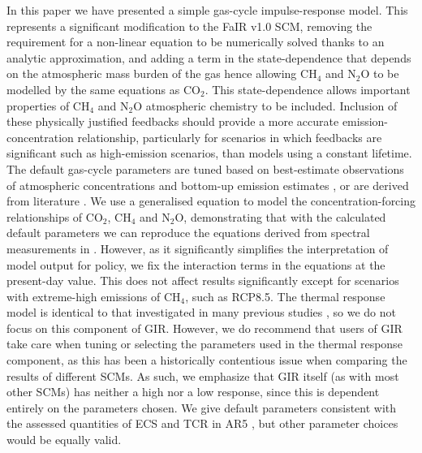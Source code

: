\documentclass[gmd, manuscript]{copernicus}
\begin{document}
\conclusions  %
In this paper we have presented a simple gas-cycle impulse-response model. This represents a significant modification to the FaIR v1.0 SCM, removing the requirement for a non-linear equation to be numerically solved thanks to an analytic approximation, and adding a term in the state-dependence that depends on the atmospheric mass burden of the gas hence allowing CH$_4$ and N$_2$O to be modelled by the same equations as CO$_2$. This state-dependence allows important properties of CH$_4$ and N$_2$O atmospheric chemistry to be included. Inclusion of these physically justified feedbacks should provide a more accurate emission-concentration relationship, particularly for scenarios in which feedbacks are significant such as high-emission scenarios, than models using a constant lifetime. The default gas-cycle parameters are tuned based on best-estimate observations of atmospheric concentrations and bottom-up emission estimates \citep{Meinshausen2017,Gutschow2016,Saunois}, or are derived from literature \citep{Prather2015,Holmes2013,Joos2013}. We use a generalised equation to model the concentration-forcing relationships of CO$_2$, CH$_4$ and N$_2$O, demonstrating that with the calculated default parameters we can reproduce the equations derived from spectral measurements in \cite{Etminan2016}. However, as it significantly simplifies the interpretation of model output for policy, we fix the interaction terms in the \cite{Etminan2016} equations at the present-day value. This does not affect results significantly except for scenarios with extreme-high emissions of CH$_4$, such as RCP8.5. The thermal response model is identical to that investigated in many previous studies \citep{Millar2016,Smith2017,Good2011,Geoffroy2013,Geoffroy2013a,Tsutsui2017}, so we do not focus on this component of GIR. However, we do recommend that users of GIR take care when tuning or selecting the parameters used in the thermal response component, as this has been a historically contentious issue when comparing the results of different SCMs. As such, we emphasize that GIR itself (as with most other SCMs) has neither a high nor a low response, since this is dependent entirely on the parameters chosen. We give default parameters consistent with the assessed quantities of ECS and TCR in AR5 \citep{Myhre2013a}, but other parameter choices would be equally valid.\\\\
\end{document}
